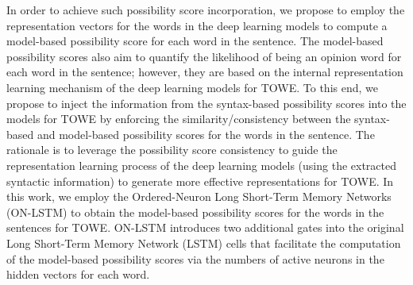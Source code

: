 \documentclass[11pt,a4paper]{article}
\begin{document}
In order to achieve such possibility score incorporation, we propose to employ the representation vectors for the words in the deep learning models to compute a model-based possibility score for each word in the sentence. The model-based possibility scores also aim to quantify the likelihood of being an opinion word for each word in the sentence; however, they are based on the internal representation learning mechanism of the deep learning models for TOWE. To this end, we propose to inject the information from the syntax-based possibility scores into the models for TOWE by enforcing the similarity/consistency between the syntax-based and model-based possibility scores for the words in the sentence. The rationale is to leverage the possibility score consistency to guide the representation learning process of the deep learning models (using the extracted syntactic information) to generate more effective representations for TOWE. In this work, we employ the Ordered-Neuron Long Short-Term Memory Networks (ON-LSTM) \cite{Shen2019ordered} to obtain the model-based possibility scores for the words in the sentences for TOWE. ON-LSTM introduces two additional gates into the original Long Short-Term Memory Network (LSTM) cells that facilitate the computation of the model-based possibility scores via the numbers of active neurons in the hidden vectors for each word.
\end{document}
